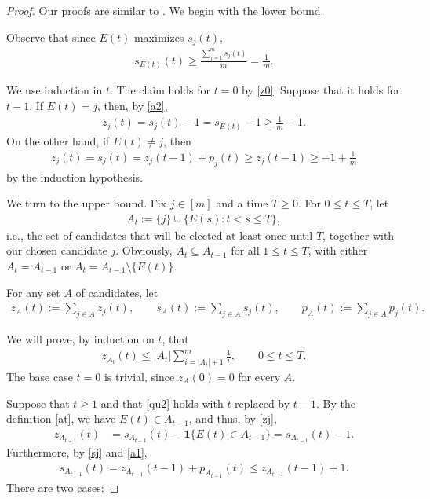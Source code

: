 \documentclass[11pt,reqno,tbtags,a4paper]{amsart}
\numberwithin{equation}{section}
\renewcommand\le{\leq}
\renewcommand\ge{\geq}
\renewcommand\leq{\leqslant}
\renewcommand\geq{\geqslant}
\theoremstyle{plain}%
\theoremstyle{definition}
\theoremstyle{remark}
\newcounter{cases}
\newcommand{\sumjm}{\sum_{j=1}^m}
\newcommand\set[1]{\ensuremath{\{#1\}}}
\newcommand\xcpar[1]{\{#1\}}
\newcommand\indic[1]{\boldsymbol1\xcpar{#1}}
\newcommand\0{{\boldsymbol 0}}
\newcommand\1{{\boldsymbol 1}}
\begin{document}
\begin{proof}
Our proofs are similar to \cite{Coppersmith}.
We begin with the lower bound.

Observe that since $E(t)$ maximizes $s_j(t)$,
\begin{align}\label{a2}
  s_{E(t)}(t) \ge \frac{\sumjm s_j(t)}{m}=\frac{1}{m}.
\end{align}

  We use induction in $t$. The claim holds for $t=0$ by \eqref{z0}.
Suppose that it holds for $t-1$.
%
If $E(t)=j$, then, by \eqref{a2},
\begin{align}\label{a21}
z_j(t)=s_j(t)-1=s_{E(t)}-1\ge\frac{1}{m}-1. 
\end{align}
%
On the other hand, if
$E(t)\neq j$, then 
\begin{align}\label{a22}
  z_j(t)=s_j(t)=z_j(t-1)+p_j(t)\ge z_j(t-1)\ge-1+\frac{1}{m}
\end{align}
by the induction hypothesis.

We turn to the upper bound.
%
Fix $j\in[m]$ and a time $T\ge0$.
For $0\le t\le T$,
let 
\begin{align}\label{at}
  A_t:=\set{j}\cup\set{E(s):t<s\le T},
\end{align}
i.e., the set of candidates that will be elected at least once
until $T$, together with our chosen candidate $j$.
Obviously, $A_{t}\subseteq A_{t-1}$ for all $1\le t \le T$, with
either $A_{t}=A_{t-1}$ or $A_{t}=A_{t-1}\setminus\set{E(t)}$.

For any set $A$ of candidates, let
\begin{align}\label{qu1}
  z_A(t):=\sum_{j\in A} z_j(t),
\qquad
  s_A(t):=\sum_{j\in A} s_j(t),
\qquad
  p_A(t):=\sum_{j\in A} p_j(t)
.\end{align}

We will prove, by induction on $t$, that
\begin{align}\label{qu2}
  z_{A_t}(t) \le |A_t|\sum_{i=|A_t|+1}^m\frac{1}{i},
\qquad 0\le t\le T.
\end{align}
The base case $t=0$ is trivial, since $z_A(0)=0$ for every $A$.

Suppose that $t\ge1$ and that \eqref{qu2} holds with $t$ replaced by $t-1$.
By the definition \eqref{at}, we have $E(t)\in A_{t-1}$, and thus, 
by \eqref{zj}, %
\begin{align}\label{qu3}
  z_{A_{t-1}}(t)&
=s_{A_{t-1}}(t)-\indic{E(t)\in A_{t-1}}
= s_{A_{t-1}}(t)-1 
%
%
%
.\end{align}
Furthermore, by \eqref{sj} and \eqref{a1},
\begin{align} \label{qu6}
 s_{A_{t-1}}(t)
= z_{A_{t-1}}(t-1)+ p_{A_{t-1}}(t)
\le z_{A_{t-1}}(t-1)+1
.\end{align}
There are two cases:


\end{proof}
\end{document}
